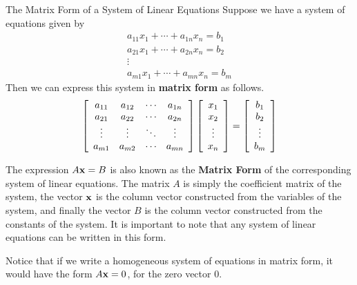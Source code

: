 \begin{definition}{The Matrix Form of a System of Linear Equations}\label{def:matrixform}
Suppose we have a system of equations given by
\begin{equation*}
\begin{array}{c}
a_{11}x_{1}+\cdots +a_{1n}x_{n}=b_{1} \\
a_{21}x_{1}+ \cdots + a_{2n}x_{n} = b_{2} \\
\vdots \\
a_{m1}x_{1}+\cdots +a_{mn}x_{n}=b_{m}
\end{array}
\end{equation*}
Then we can express this system in \textbf{matrix form}  as follows.
\begin{equation*}
\left[
\begin{array}{cccc}
a_{11} & a_{12} & \cdots & a_{1n} \\
a_{21} & a_{22} & \cdots & a_{2n} \\
\vdots & \vdots & \ddots & \vdots \\
a_{m1} & a_{m2} & \cdots & a_{mn}
\end{array}
\right]
\left[
\begin{array}{c}
x_{1} \\
x_{2} \\
\vdots \\
x_{n}
\end{array}
\right]
=
\left[
\begin{array}{c}
b_{1}\\
b_{2}\\
\vdots \\
b_{m}
\end{array}
\right]
\end{equation*}
 
\end{definition}

The expression $A\mathbf{x}=B$ is also known as the \textbf{Matrix Form} of the
corresponding system of linear equations.  The
matrix $A$ is simply the coefficient matrix of the system, the vector
$\mathbf{x}$ is the column vector constructed from the variables of the system,
and finally the vector $B$ is the column vector constructed from the constants
of the system.  It is important to note that any system of linear
equations can be written in this form.

Notice that if we write a homogeneous system of equations in matrix form, it would have the form
$A\mathbf{x}=0$, for the zero vector $0$.

